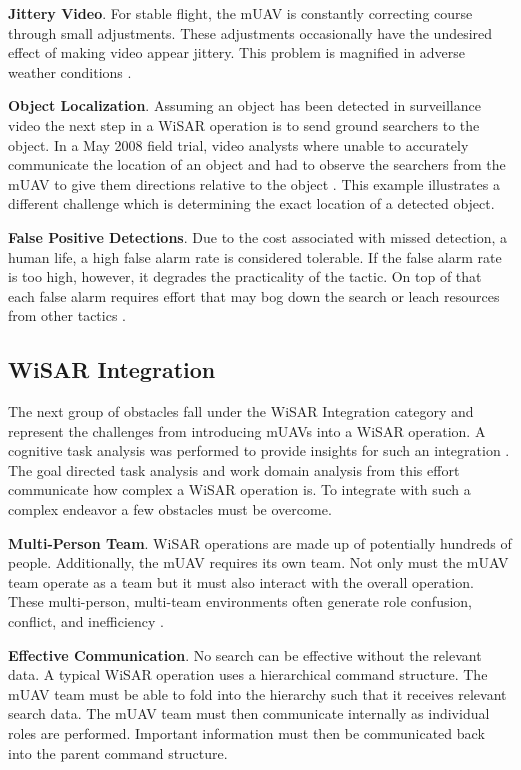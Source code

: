 \textbf{Jittery Video}.  For stable flight, the mUAV is constantly correcting
course through small adjustments.  These adjustments occasionally have the
undesired effect of making video appear jittery.  This problem is magnified
in adverse weather conditions \cite{goodrich2009towards}.

\textbf{Object Localization}.  Assuming an object
has been detected in surveillance video the next step in a WiSAR operation is to send ground
searchers to the object.
In a May 2008 field trial, video analysts where unable to accurately communicate
the location of an object and had to observe the searchers from the mUAV to give
them directions relative to the object \cite{goodrich2009towards}.  This example
illustrates a different challenge which is determining the exact location of a
detected object.

\textbf{False Positive Detections}.  Due to the cost associated with missed
detection, a human life, a high false alarm rate is considered tolerable.  If
the false alarm rate is too high, however, it degrades the practicality of the
tactic.  On top of that each false alarm requires effort that may bog down the
search or leach resources from other tactics \cite{goodrich2008supporting}.

\subsection{WiSAR Integration}
The next group of obstacles fall under the WiSAR Integration category and
represent the challenges from introducing mUAVs into a WiSAR operation.
A cognitive task analysis was performed to provide
insights for such an integration  \cite{adams2009cognitive}.  The goal directed
task analysis and work domain analysis from this effort communicate how complex a
WiSAR operation is.  To integrate with such a complex endeavor a few obstacles
must be overcome.

\textbf{Multi-Person Team}.  WiSAR operations are made up
of potentially hundreds of people.  Additionally, the mUAV requires its own
team.  Not only must the mUAV team operate as a team but it must also interact
with the overall operation.  These multi-person, multi-team environments often
generate role confusion, conflict, and inefficiency
\cite{goodrich2008supporting}.

\textbf{Effective Communication}.  No search can be
effective without the relevant data.  A typical WiSAR operation uses a
hierarchical command structure.  The mUAV team must be able to fold into the
hierarchy such that it receives relevant search data.  The mUAV team must then
communicate internally as individual roles are performed.  Important information
must then be communicated back into the parent command structure.

